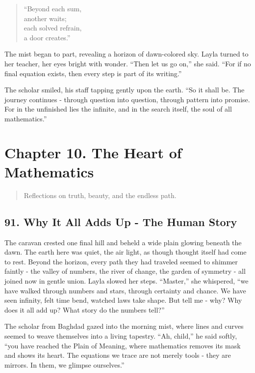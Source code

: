 \documentclass[
  letterpaper,
  DIV=11,
  numbers=noendperiod]{scrreprt}
\begin{document}
\begin{quote}
``Beyond each sum,\\
another waits;\\
each solved refrain,\\
a door creates.''
\end{quote}

The mist began to part, revealing a horizon of dawn-colored sky. Layla
turned to her teacher, her eyes bright with wonder. ``Then let us go
on,'' she said. ``For if no final equation exists, then every step is
part of its writing.''

The scholar smiled, his staff tapping gently upon the earth. ``So it
shall be. The journey continues - through question into question,
through pattern into promise. For in the unfinished lies the infinite,
and in the search itself, the soul of all mathematics.''

\section{Chapter 10. The Heart of
Mathematics}\label{chapter-10.-the-heart-of-mathematics}

\begin{quote}
Reflections on truth, beauty, and the endless path.
\end{quote}

\subsection{91. Why It All Adds Up - The Human
Story}\label{why-it-all-adds-up---the-human-story}

The caravan crested one final hill and beheld a wide plain glowing
beneath the dawn. The earth here was quiet, the air light, as though
thought itself had come to rest. Beyond the horizon, every path they had
traveled seemed to shimmer faintly - the valley of numbers, the river of
change, the garden of symmetry - all joined now in gentle union. Layla
slowed her steps. ``Master,'' she whispered, ``we have walked through
numbers and stars, through certainty and chance. We have seen infinity,
felt time bend, watched laws take shape. But tell me - why? Why does it
all add up? What story do the numbers tell?''

The scholar from Baghdad gazed into the morning mist, where lines and
curves seemed to weave themselves into a living tapestry. ``Ah, child,''
he said softly, ``you have reached the Plain of Meaning, where
mathematics removes its mask and shows its heart. The equations we trace
are not merely tools - they are mirrors. In them, we glimpse
ourselves.''
\end{document}
